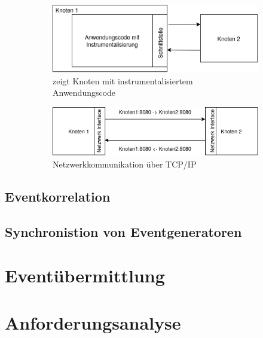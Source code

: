 \begin{figure}[!ht]
	\centering
	\begin{subfigure}[t]{.49\linewidth}
		\centering\includegraphics[width=0.9\linewidth]{img/Problembeschreibung/distributed_system_application_inside.png}
		\caption[Abbildung]{zeigt Knoten mit instrumentalisiertem Anwendungscode}
		\label{fig:distributed_system_application_inside}
	\end{subfigure}
	\begin{subfigure}[t]{.49\linewidth}
		\centering\includegraphics[width=\linewidth]{img/Problembeschreibung/distributed_system_network.png}
		\caption[Abbildung]{Netzwerkkommunikation über TCP/IP}
		\label{fig:distributed_system_network}
	\end{subfigure}
	\caption[Anwendungsinstrumentalisierung und Netzwerkkommunikation über TCP/IP in verteilten Systemen]{}
\end{figure} 


\subsection{Eventkorrelation}
\label{subsection:Eventkorrelation}
\subsection{Synchronistion von Eventgeneratoren}
\label{subsection:Synchronistion von Eventgeneratoren}
\section{Eventübermittlung}
\label{section:Eventübermittlung}
\section{Anforderungsanalyse}
\label{section:Anforderungsanalyse}

